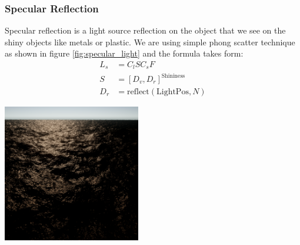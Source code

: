 \subsubsection{Specular Reflection}
Specular reflection is a light source reflection on the object that we see on the shiny objects like metals or plastic.
We are using simple phong scatter technique as shown in figure \ref{fig:specular_light} and the formula takes form:
\begin{equation}
    \begin{split}
        L_s &= C_l S C_s F\\
        S &= [D_v, D_r]^{\text{Shininess}}\\
        D_r &= \text{reflect}(\text{LightPos}, N)
    \end{split}
\end{equation}
\begin{minipage}{1\textwidth}
    \centering
    \includegraphics[width=0.45\textwidth]{"images/specular_light.png"}
    \label{fig:specular_light}
\end{minipage}

